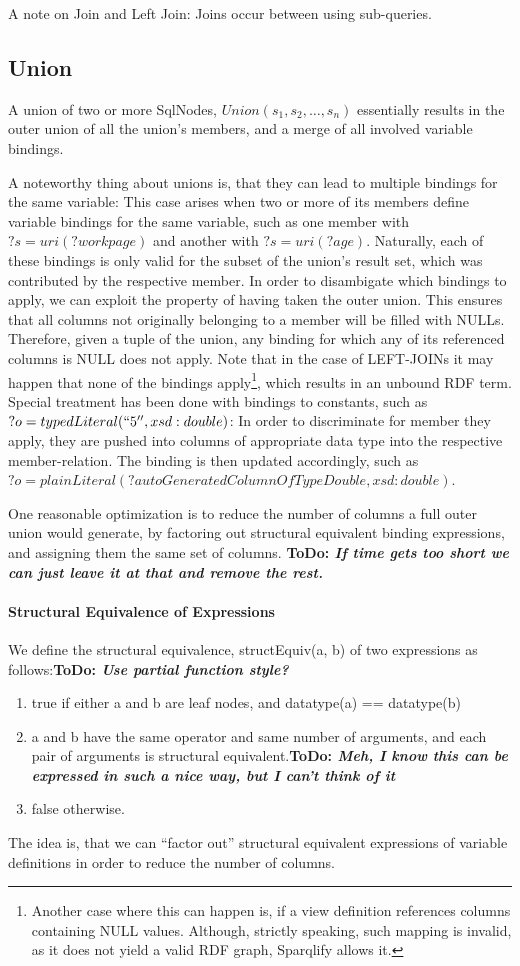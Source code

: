 \documentclass[a4paper,twoside,bibtotoc,abstracton,12pt,BCOR=15mm]{scrreprt}
\newcommand{\todo}[1]{\textbf{ToDo: \textit{#1}}}
\begin{document}
A note on Join and Left Join: Joins occur between using sub-queries.


\subsection{Union}
A union of two or more SqlNodes, $Union(s_1, s_2, \ldots, s_n)$ essentially results in the outer union of all
the union's members, and a merge of all involved variable bindings.

A noteworthy thing about unions is, that they can lead to multiple bindings for the same variable:
This case arises when two or more of its members define variable bindings for the same variable, such as one member with $?s = uri(?workpage)$ and another with $?s = uri(?age)$.
Naturally, each of these bindings is only valid for the subset of the union's result set, which was contributed by the respective member.
In order to disambigate which bindings to apply, we can exploit the property of having taken the outer union. This ensures that all columns not originally belonging to a member will be filled with NULLs.
Therefore, given a tuple of the union, any binding for which any of its referenced columns is NULL does not apply. Note that in the case of LEFT-JOINs it may happen that none of the bindings
apply\footnote{Another case where this can happen is, if a view definition references columns containing NULL values. Although, strictly speaking, such mapping is invalid, as it does not yield a valid RDF graph, Sparqlify allows it.}, which
results in an unbound RDF term.
Special treatment has been done with bindings to constants, such as $?o = typedLiteral(``5'', xsd:double)$: In order to discriminate for member they apply,
they are pushed into columns of appropriate data type into the respective member-relation. The binding is then updated accordingly, such as $?o = plainLiteral(?autoGeneratedColumnOfTypeDouble, xsd:double)$.


One reasonable optimization is to reduce the number of columns a full outer union would generate, by factoring out structural equivalent binding expressions, and assigning them the same set of columns.
\todo{If time gets too short we can just leave it at that and remove the rest.}
\paragraph{Structural Equivalence of Expressions} We define the structural equivalence, structEquiv(a, b) of two expressions as follows:\todo{Use partial function style?}
\begin{enumerate}
  \item true if either a and b are leaf nodes, and datatype(a) == datatype(b)
  \item a and b have the same operator and same number of arguments, and each pair of arguments is structural equivalent.\todo{Meh, I know this can be expressed in such a nice way, but I can't think of it} 
  \item false otherwise.
\end{enumerate}
The idea is, that we can ``factor out'' structural equivalent expressions of variable definitions in order to reduce the number of columns.
\end{document}
